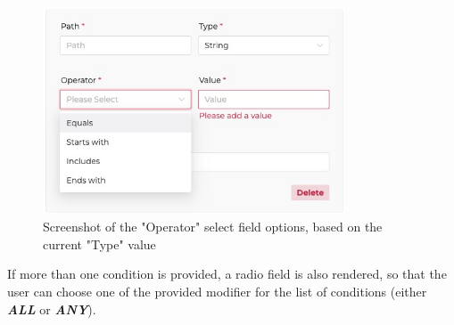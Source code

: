 
      \begin{figure}[!ht]
        \centering
        \includegraphics[width=0.8\textwidth]{images/ss_condition_op.jpeg}
        \caption{Screenshot of the "Operator" select field options, based on the current "Type" value}
      \end{figure}
      
      If more than one condition is provided, a radio field is also rendered, so that the user can choose one of the provided modifier for the list of conditions (either \textbf{\emph{ALL}} or \textbf{\emph{ANY}}). 

